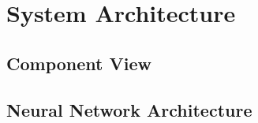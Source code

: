 \chapter{System Architecture}
\label{ch:SystemArchitecture}
\section{Component View}
\section{Neural Network Architecture}